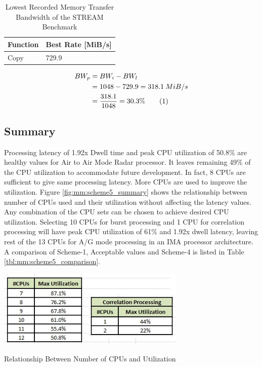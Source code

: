 \begin{table}[h!]
	\centering
	\begin{tabular}{|l|l|} 
	 \hline
	 \textbf{Function} & \textbf{Best Rate [MiB/s]} \\
	 \hline
	 Copy & 729.9 \\ \hline
	\end{tabular}
	\caption{Lowest Recorded Memory Transfer Bandwidth of the STREAM Benchmark}
	\label{tbl:mm:scheme5_mem_bw}
\end{table}

\begin{align*}
\label{aa:scheme4:mem_bw}
	BW_{p} &= BW_{i} - BW_{l} \\
	&= 1048 - 729.9 =  318.1 \: MiB/s \\
	&= \frac{318.1}{1048} = 30.3 \% \stepcounter{equation}\tag{\theequation} 
\end{align*}

\subsection{Summary}
\label{ss:mm:scheme5:summary}

Processing latency of 1.92x Dwell time and peak CPU utilization of 50.8\% are healthy values for Air to Air Mode Radar processor. It leaves remaining 49\% of the CPU utilization to accommodate future development. In fact, 8 CPUs are sufficient to give same processing latency. More CPUs are used to improve the utilization. Figure \ref{fig:mm:scheme5_summary} shows the relationship between number of CPUs used and their utilization without affecting the latency values. Any combination of the CPU sets can be chosen to achieve desired CPU utilization. Selecting 10 CPUs for burst processing and 1 CPU for correlation processing will have peak CPU utilization of 61\% and 1.92x dwell latency, leaving rest of the 13 CPUs for A/G mode processing in an IMA processor architecture. A comparison of  Scheme-1, Acceptable values and Scheme-4 is listed in Table \ref{tbl:mm:scheme5_comparison}.

\begin{table}[h!]
	\centering
	\includegraphics[width=90mm]{figures/scheme5_summary}
	\caption{Relationship Between Number of CPUs and Utilization}
	\label{fig:mm:scheme5_summary}
\end{table}

